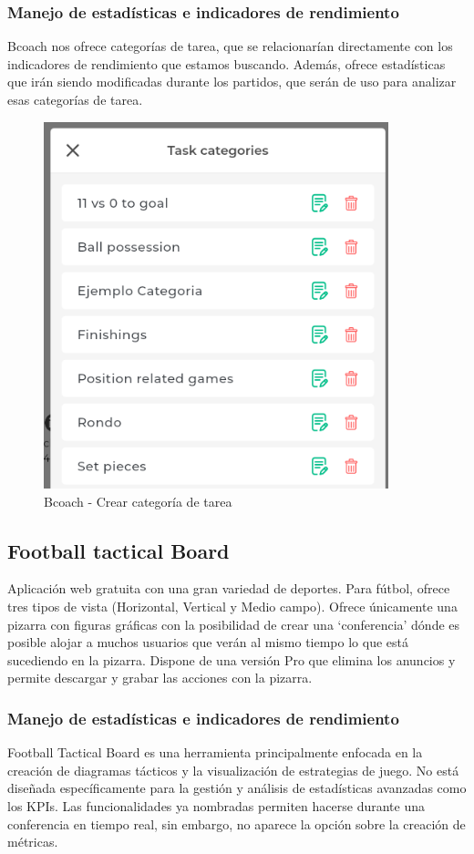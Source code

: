 \subsubsection{Manejo de estadísticas e indicadores de rendimiento}
Bcoach nos ofrece categorías de tarea, que se relacionarían directamente con los indicadores de rendimiento que estamos buscando. Además, ofrece estadísticas que irán siendo modificadas durante los partidos, que serán de uso para analizar esas categorías de tarea.

\begin{figure}[H]
    \centering
    \includegraphics[width=10cm]{archivos/tfg_jorge/bcoach_kpis}
    \caption{Bcoach - Crear categoría de tarea}\label{sistemass2}
\end{figure}

\subsection{Football tactical Board}
Aplicación web gratuita con una gran variedad de deportes. Para fútbol, ofrece tres tipos de vista (Horizontal, Vertical y Medio campo). Ofrece únicamente una pizarra con figuras gráficas con la posibilidad de crear una ‘conferencia’ dónde es posible alojar a muchos usuarios que verán al mismo tiempo lo que está sucediendo en la pizarra.
Dispone de una versión Pro que elimina los anuncios y permite descargar y grabar las acciones con la pizarra.

\subsubsection{Manejo de estadísticas e indicadores de rendimiento}
Football Tactical Board es una herramienta principalmente enfocada en la creación de diagramas tácticos y la visualización de estrategias de juego. No está diseñada específicamente para la gestión y análisis de estadísticas avanzadas como los KPIs. Las funcionalidades ya nombradas permiten hacerse durante una conferencia en tiempo real, sin embargo, no aparece la opción sobre la creación de métricas.


